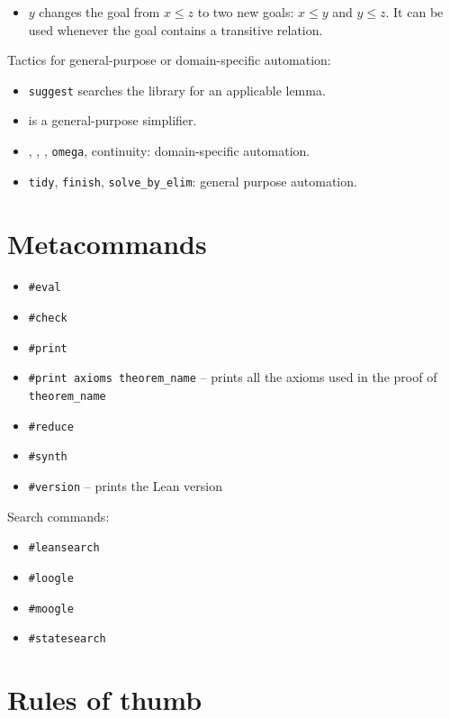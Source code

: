 \documentclass[a4paper]{article}
\begin{document}

\begin{itemize}
    \item \texttt{\trans $y$} changes the goal from $x \leq z$ to two new goals: $x \leq y$ and $y \leq z$. It can be used whenever the goal contains a transitive relation.
\end{itemize}

Tactics for general-purpose or domain-specific automation:
\begin{itemize}
    \item \texttt{suggest} searches the library for an applicable lemma.
    \item \simp is a general-purpose simplifier.
    \item \abel, \ring, \linarith, \texttt{omega}, continuity: domain-specific automation.
    \item \texttt{tidy}, \texttt{finish}, \texttt{solve\_by\_elim}: general purpose automation.
\end{itemize}

\section{Metacommands}

\begin{itemize}
    \item \texttt{\#eval}
    \item \texttt{\#check}
    \item \texttt{\#print}
    \item \texttt{\#print axioms theorem\_name} -- prints all the axioms used in the proof of \texttt{theorem\_name}
    \item \texttt{\#reduce}
    \item \texttt{\#synth}
    \item \texttt{\#version} -- prints the Lean version
\end{itemize}

Search commands:
\begin{itemize}
    \item \texttt{\#leansearch}
    \item \texttt{\#loogle}
    \item \texttt{\#moogle}
    \item \texttt{\#statesearch}
\end{itemize}

\section{Rules of thumb}
\end{document}
